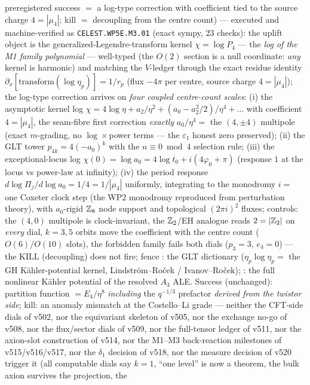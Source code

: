 preregistered success $=$ a log-type correction with coefficient tied to the source charge
$4=|\mu_4|$; kill $=$ decoupling from the centre count) --- executed and machine-verified as
\texttt{CELEST.WP5E.M3.01}  (exact sympy, $23$
checks): the uplift object is the generalized-Legendre-transform kernel $\chi=\log P_4$ --- the
\emph{log of the M1 family polynomial} --- well-typed (the $O(2)$ section is a null coordinate:
\emph{any} kernel is harmonic) and matching the $V$-ledger through the exact residue identity
$\partial_x[\mathrm{transform}(\log\eta_p)]=1/r_p$ (flux $-4\pi$ per centre, source charge
$4=|\mu_4|$); the log-type correction arrives on \emph{four coupled centre-count scales}:
(i) the asymptotic kernel log $\chi=4\log\eta+a_2/\eta^2+(a_0-a_2^2/2)/\eta^4+\dots$ with
coefficient $4=|\mu_4|$, the seam-fibre first correction \emph{exactly} $a_0/\eta^4=$ the
$(4,\pm4)$ multipole (exact $m$-grading, no $\log\times$power terms --- the $\varepsilon_1$
honest zero preserved); (ii) the GLT tower $p_{4k}=4(-a_0)^k$ with the $n\equiv0\bmod4$
selection rule; (iii) the exceptional-locus log $\chi(0)=\log a_0=4\log t_0+i(4\varphi_0+\pi)$
(response $1$ at the locus vs power-law at infinity); (iv) the period response
$d\log\Pi_j/d\log a_0=1/4=1/|\mu_4|$ uniformly, integrating to the monodromy $i=$ one Coxeter
clock step (the WP2 monodromy reproduced from perturbation theory), with $a_0$-rigid $\mathbb Z_8$ node
support and topological $(2\pi i)^2$ fluxes; controls: the $(4,0)$ multipole is clock-invariant,
the $\mathbb Z_2$/EH analogue reads $2=|\mathbb Z_2|$ on \emph{every} dial, $k=3,5$ orbits move the
coefficient with the centre count ($O(6)/O(10)$ slots), the forbidden family fails both dials
($p_3=3$, $e_4=0$) --- the KILL (decoupling) does not fire; fence \mC: the GLT dictionary
($\eta_p\log\eta_p=$ the GH K\"ahler-potential kernel, Lindstr\"om--Ro\v{c}ek /
Ivanov--Ro\v{c}ek); \mO: the full nonlinear K\"ahler potential of the resolved $A_3$ ALE.
Success (unchanged): partition function $=E_4/\eta^8$
\emph{including} the
$q^{-1/3}$ prefactor \emph{derived from the twistor side}; kill: an anomaly mismatch at the
Costello--Li grade --- neither the CFT-side dials of v502, nor the equivariant skeleton of v505,
nor the exchange no-go of v508, nor the flux/sector dials of v509, nor the full-tensor ledger of
v511, nor the axion-slot construction of v514, nor the M1--M3 back-reaction milestones of
v515/v516/v517, nor the $\delta_1$ decision of v518, nor the measure decision of v520 trigger it (all computable
dials say $k=1$, ``one level'' is now a theorem, the bulk axion survives the projection, the
